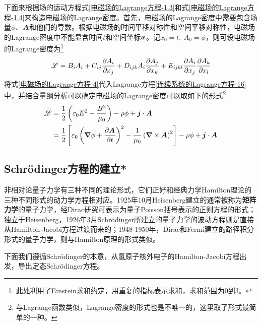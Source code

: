 下面来根据场的运动方程式\eqref{电磁场的Lagrange方程-1.3}和式\eqref{电磁场的Lagrange方程-1.4}来构造电磁场的Lagrange密度。首先，电磁场的Lagrange密度中需要包含场量$\phi$、$\boldsymbol{A}$和他们的导数。根据电磁场的时间平移对称性和空间平移对称性，电磁场的Lagrange密度中不能显含时间$t$和空间坐标$\boldsymbol{x}$。记$x_0 = t,~A_0 = \phi$，则可设电磁场的Lagrange密度为\footnote{此处利用了Einstein求和约定，用重复的指标表示求和，求和范围为$0$到$3$。}
\begin{equation}
	\mathscr{L} = B_iA_i+ C_{ij}\frac{\partial A_i}{\partial x_j} + D_{ijk}A_i\frac{\partial A_j}{\partial x_k} + E_{ijkl} \frac{\partial A_i}{\partial x_j}\frac{\partial A_k}{\partial x_l}
	\label{电磁场的Lagrange方程-4}
\end{equation}
将式\eqref{电磁场的Lagrange方程-4}代入Lagrange方程\eqref{连续系统的Lagrange方程-16}中，并结合量纲分析可以确定电磁场的Lagrange密度可以取如下的形式\footnote{与Lagrange函数类似，Lagrange密度的形式也是不唯一的，这里取了形式最简单的一种。}
\begin{align}
	\mathscr{L} & = \frac12 \left(\varepsilon_0E^2-\frac{B^2}{\mu_0}\right) - \rho \phi + \boldsymbol{j}\cdot \boldsymbol{A} \nonumber \\
	& = \frac12 \left[\varepsilon_0\left(\boldsymbol{\nabla}\phi+\frac{\partial \boldsymbol{A}}{\partial t}\right)^2-\frac{1}{\mu_0}\left(\boldsymbol{\nabla} \times \boldsymbol{A}\right)^2\right] - \rho \phi + \boldsymbol{j}\cdot \boldsymbol{A}
	\label{电磁场的Lagrange方程-5}
\end{align}

\subsection{Schr\"{o}dinger方程的建立*}

非相对论量子力学有三种不同的理论形式，它们正好和经典力学Hamilton理论的三种不同形式的动力学方程相对应。1925年10月Heisenberg建立的通常被称为{\bf 矩阵力学}的量子力学，经Dirac研究可表示为量子Poisson括号表示的正则方程的形式；独立于Heisenberg，1926年3月Schr\"{o}dinger所建立的量子力学的波动方程则是直接从Hamilton-Jacobi方程过渡而来的；1948-1950年，Dirac和Fermi建立的路径积分形式的量子力学，则与Hamilton原理的形式类似。

下面我们遵循Schr\"{o}dinger的本意，从氢原子核外电子的Hamilton-Jacobi方程出发，导出定态Schr\"{o}dinger方程。

